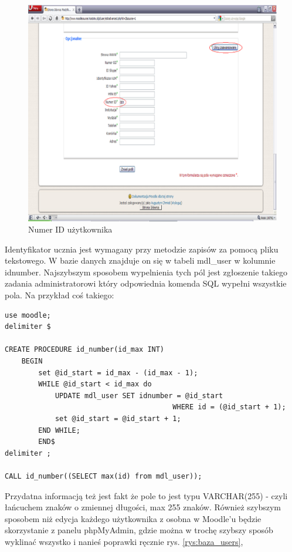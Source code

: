 \begin{figure}[!h]
	\centering
		\caption{Numer ID użytkownika} \label{rys:nr_id}
		\includegraphics[width=1\textwidth]{projekt_sys//rys//nr_id.eps}
\end{figure}
Identyfikator ucznia jest wymagany przy metodzie zapisów za pomocą pliku tekstowego. W bazie danych znajduje on się w tabeli mdl\_user w kolumnie idnumber. Najszybszym sposobem wypelnienia tych pól jest zgłoszenie takiego zadania administratorowi który odpowiednia komenda SQL wypełni wszystkie pola. Na przykład coś takiego:
\begin{verbatim}
use moodle;
delimiter $

CREATE PROCEDURE id_number(id_max INT)
	BEGIN
		set @id_start = id_max - (id_max - 1);
		WHILE @id_start < id_max do
			UPDATE mdl_user SET idnumber = @id_start
                                        WHERE id = (@id_start + 1);
			set @id_start = @id_start + 1;
		END WHILE;
        END$
delimiter ;

CALL id_number((SELECT max(id) from mdl_user));
\end{verbatim}
Przydatna informacją też jest fakt że pole to jest typu VARCHAR(255) - czyli łańcuchem znaków o zmiennej długości, max 255 znaków. Również szybszym sposobem niż edycja każdego użytkownika z osobna w Moodle'u będzie skorzystanie z panelu phpMyAdmin, gdzie można w trochę szybszy sposób wyklinać wszystko i nanieś poprawki ręcznie rys. \ref{rys:baza_users},
